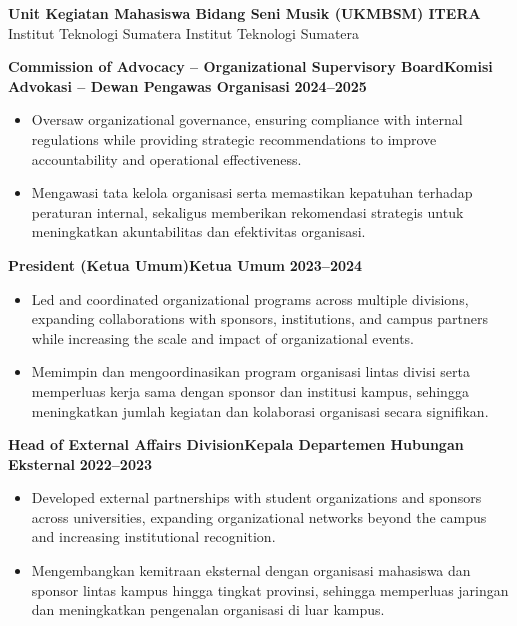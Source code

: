 

\textbf{Unit Kegiatan Mahasiswa Bidang Seni Musik (UKMBSM) ITERA} \\
\ifenglish
Institut Teknologi Sumatera
\else
Institut Teknologi Sumatera
\fi

\textbf{\ifenglish Commission of Advocacy – Organizational Supervisory Board\else Komisi Advokasi – Dewan Pengawas Organisasi\fi}
\hfill \textbf{2024--2025}
\begin{itemize}[leftmargin=*, itemsep=1pt, topsep=1pt]
\ifenglish
\item Oversaw organizational governance, ensuring compliance with internal regulations while providing strategic recommendations to improve accountability and operational effectiveness.
\else
\item Mengawasi tata kelola organisasi serta memastikan kepatuhan terhadap peraturan internal, sekaligus memberikan rekomendasi strategis untuk meningkatkan akuntabilitas dan efektivitas organisasi.
\fi
\end{itemize}

\textbf{\ifenglish President (Ketua Umum)\else Ketua Umum\fi}
\hfill \textbf{2023--2024}
\begin{itemize}[leftmargin=*, itemsep=1pt, topsep=1pt]
\ifenglish
\item Led and coordinated organizational programs across multiple divisions, expanding collaborations with sponsors, institutions, and campus partners while increasing the scale and impact of organizational events.
\else
\item Memimpin dan mengoordinasikan program organisasi lintas divisi serta memperluas kerja sama dengan sponsor dan institusi kampus, sehingga meningkatkan jumlah kegiatan dan kolaborasi organisasi secara signifikan.
\fi
\end{itemize}

\textbf{\ifenglish Head of External Affairs Division\else Kepala Departemen Hubungan Eksternal\fi}
\hfill \textbf{2022--2023}
\begin{itemize}[leftmargin=*, itemsep=1pt, topsep=1pt]
\ifenglish
\item Developed external partnerships with student organizations and sponsors across universities, expanding organizational networks beyond the campus and increasing institutional recognition.
\else
\item Mengembangkan kemitraan eksternal dengan organisasi mahasiswa dan sponsor lintas kampus hingga tingkat provinsi, sehingga memperluas jaringan dan meningkatkan pengenalan organisasi di luar kampus.
\fi
\end{itemize}